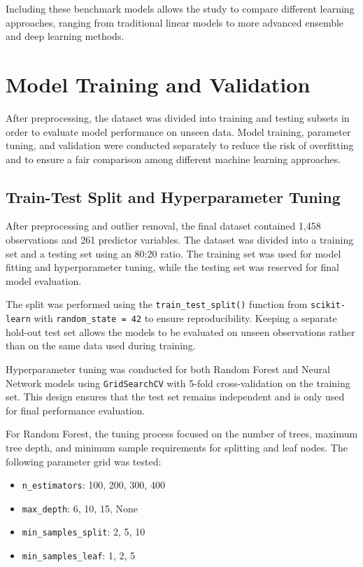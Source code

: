 \documentclass[12pt,a4paper,oneside,openany]{book}
\begin{document}
Including these benchmark models allows the study to compare different learning approaches, ranging from traditional linear models to more advanced ensemble and deep learning methods.


\section{Model Training and Validation}

After preprocessing, the dataset was divided into training and testing subsets in order to evaluate model performance on unseen data. Model training, parameter tuning, and validation were conducted separately to reduce the risk of overfitting and to ensure a fair comparison among different machine learning approaches.

\subsection{Train-Test Split and Hyperparameter Tuning}

After preprocessing and outlier removal, the final dataset contained 1,458 observations and 261 predictor variables. The dataset was divided into a training set and a testing set using an 80:20 ratio. The training set was used for model fitting and hyperparameter tuning, while the testing set was reserved for final model evaluation.

The split was performed using the \texttt{train\_test\_split()} function from \texttt{scikit-learn} with \texttt{random\_state = 42} to ensure reproducibility. Keeping a separate hold-out test set allows the models to be evaluated on unseen observations rather than on the same data used during training.

Hyperparameter tuning was conducted for both Random Forest and Neural Network models using \texttt{GridSearchCV} with 5-fold cross-validation on the training set. This design ensures that the test set remains independent and is only used for final performance evaluation.

For Random Forest, the tuning process focused on the number of trees, maximum tree depth, and minimum sample requirements for splitting and leaf nodes. The following parameter grid was tested:

\begin{itemize}
    \item \texttt{n\_estimators}: 100, 200, 300, 400
    \item \texttt{max\_depth}: 6, 10, 15, None
    \item \texttt{min\_samples\_split}: 2, 5, 10
    \item \texttt{min\_samples\_leaf}: 1, 2, 5
\end{itemize}
\end{document}
